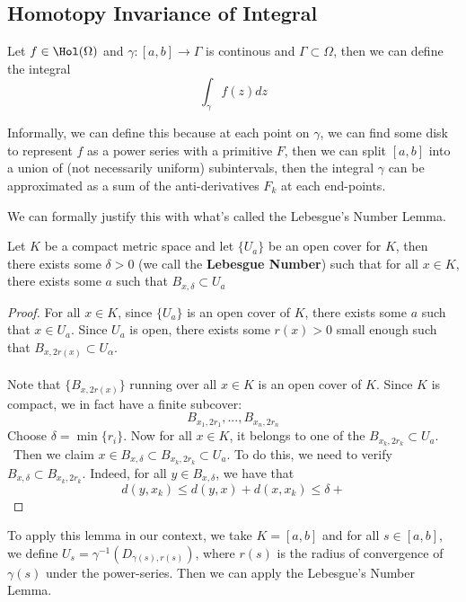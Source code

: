 \subsection{Homotopy Invariance of Integral}

Let $f \in \Hol(\Omega)$ and $\gamma: [a, b] \to \Gamma$ is continous and $\Gamma \subset \Omega$, then we can define the integral
\[\int_\gamma f(z) dz\]

Informally, we can define this because at each point on $\gamma$, we can find some disk to represent $f$ as a power series with a primitive $F$, then we can split $[a, b]$ into a union of (not necessarily uniform) subintervals, then the integral $\gamma$ can be approximated as a sum of the anti-derivatives $F_k$ at each end-points.

We can formally justify this with what's called the Lebesgue's Number Lemma.

\begin{lemma}
Let $K$ be a compact metric space and let $\{U_a\}$ be an open cover for $K$, then there exists some $\delta > 0$ (we call the \textbf{Lebesgue Number}) such that for all $x \in K$, there exists some $a$ such that $B_{x, \delta} \subset U_a$
\end{lemma}

\begin{proof}
For all $x \in K$, since $\{U_a\}$ is an open cover of $K$, there exists some $a$ such that $x \in U_a$. Since $U_a$ is open, there exists some $r(x) > 0$ small enough such that $B_{x, 2r(x)} \subset U_\alpha$.\\\\
Note that $\{B_{x, 2r(x)}\}$ running over all $x \in K$ is an open cover of $K$. Since $K$ is compact, we in fact have a finite subcover:
\[B_{x_1,2r_1}, ..., B_{x_n, 2r_n}\]
Choose $\delta = \min \{r_i\}$. Now for all $x \in K$, it belongs to one of the $B_{x_k, 2r_k} \subset U_a$.\\\
Then we claim $x \in B_{x, \delta} \subset B_{x_k, 2r_k} \subset U_a$. To do this, we need to verify $B_{x, \delta} \subset B_{x_k, 2r_k}$. Indeed, for all $y \in B_{x, \delta}$, we have that
\[d(y, x_k) \leq d(y, x) + d(x, x_k) \leq \delta +  \]
\end{proof}

To apply this lemma in our context, we take $K = [a, b]$ and for all $s \in [a, b]$, we define $U_s = \gamma^{-1}(D_{\gamma(s), r(s)})$, where $r(s)$ is the radius of convergence of $\gamma(s)$ under the power-series. Then we can apply the Lebesgue's Number Lemma.

